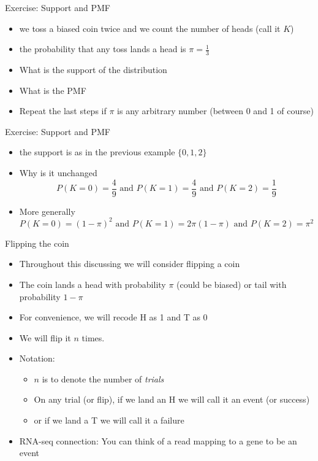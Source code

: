 \documentclass[xcolor=x11names,compress]{beamer}\usepackage[]{graphicx}\usepackage[]{color}
\begin{document}
\begin{frame}{Exercise: Support and PMF}
  \begin{itemize}
  \item we toss a biased coin twice and we count the number of heads (call it $K$)
  \item the probability that any toss lands a head is $\pi=\frac{1}{3}$
  \item What is the support of the distribution
  \item What is the PMF
  \item Repeat the last steps if $\pi$ is any arbitrary number (between 0 and 1 of course)
  \end{itemize}
\end{frame}

\begin{frame}{Exercise: Support and PMF}
  \begin{itemize}
  \item the support is as in the previous example $\{0,1,2\}$
  \item Why is it unchanged
    \begin{equation*}
      P(K=0) = \frac{4}{9} \mbox{ and } P(K=1) = \frac{4}{9} \mbox{ and } P(K=2) = \frac{1}{9} 
    \end{equation*}
  \item More generally
     \begin{equation*}
      P(K=0) = (1-\pi)^2 \mbox{ and } P(K=1) = 2\pi(1-\pi) \mbox{ and } P(K=2) =\pi^2 
    \end{equation*}
  \end{itemize}
  
\end{frame}





\begin{frame}{Flipping the coin}
  \begin{itemize}
  \item Throughout this discussing we will consider flipping
        a coin
  \item The coin lands a head with probability $\pi$ (could be biased) or tail with probability $1-\pi$
  \item For convenience, we will recode H as 1 and T as 0
  \item We will flip it $n$ times. 
  \item Notation: 
    \begin{itemize}
    \item $n$ is to denote the number of {\it trials}
    \item On any trial (or flip), if we land an H we will call it an 
          event (or success)
    \item or if we land a T we will call it a failure
    \end{itemize}
  \item RNA-seq connection: You can think of a read mapping to a gene to be an event
   \end{itemize}
\end{frame}
\end{document}
